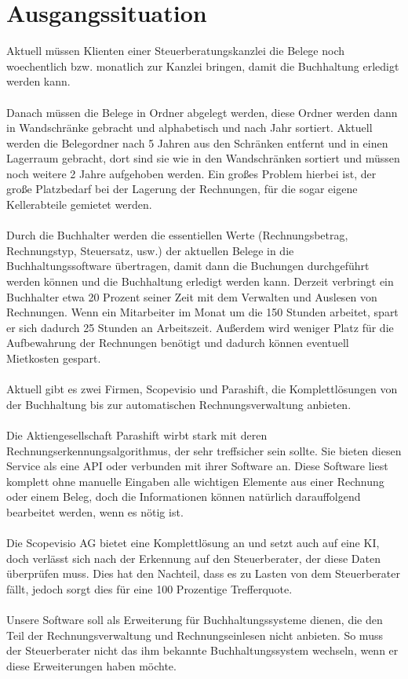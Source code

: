 \documentclass[12pt]{article}
\theoremstyle{definition}
\begin{document}
\section{Ausgangssituation}

Aktuell müssen Klienten einer Steuerberatungskanzlei die Belege noch woechentlich bzw. monatlich zur Kanzlei bringen, damit die Buchhaltung erledigt werden kann.\\ \\
Danach müssen die Belege in Ordner abgelegt werden, diese Ordner werden dann in Wandschränke gebracht und alphabetisch und nach Jahr sortiert. Aktuell werden die Belegordner nach 5 Jahren aus den Schränken entfernt und in einen Lagerraum gebracht, dort sind sie wie in den Wandschränken sortiert und müssen noch weitere 2 Jahre aufgehoben werden. Ein großes Problem hierbei ist, der große Platzbedarf bei der Lagerung der Rechnungen, für die sogar eigene Kellerabteile gemietet werden.\\ \\
Durch die Buchhalter werden die essentiellen Werte (Rechnungsbetrag, Rechnungstyp, Steuersatz, usw.) der aktuellen Belege in die Buchhaltungssoftware über\-tragen, damit dann die Buchungen durchgeführt werden können und die Buchhaltung erledigt werden kann.
Derzeit verbringt ein Buchhalter etwa 20 Prozent seiner Zeit mit dem Verwalten und Auslesen von Rechnungen. Wenn ein Mitarbeiter im Monat um die 150 Stunden arbeitet, spart er sich dadurch 25 Stunden an Arbeitszeit. Außerdem wird weniger Platz für die Aufbewahrung der Rechnungen benötigt und dadurch können eventuell Mietkosten gespart.\\ \\
Aktuell gibt es zwei Firmen, Scopevisio und Parashift, die Komplettlösungen von der Buchhaltung bis zur automatischen Rechnungsverwaltung anbieten.\\ \\
Die Aktiengesellschaft Parashift wirbt stark mit deren Rechnungserkennungsalgorithmus, der sehr treffsicher sein sollte. Sie bieten diesen Service als eine API oder verbunden mit ihrer Software an. Diese Software liest komplett ohne manuelle Eingaben alle wichtigen Elemente aus einer Rechnung oder einem Beleg, doch die Informationen können natürlich darauffolgend bearbeitet werden, wenn es nötig ist.\\ \\
Die Scopevisio AG bietet eine Komplettlösung an und setzt auch auf eine KI, doch verlässt sich nach der Erkennung auf den Steuerberater, der diese Daten überprüfen muss. Dies hat den Nachteil, dass es zu Lasten von dem Steuerberater fällt, jedoch sorgt dies für eine 100 Prozentige Trefferquote.\\ \\
Unsere Software soll als Erweiterung für Buchhaltungssysteme dienen, die den Teil der Rechnungsverwaltung und Rechnungseinlesen nicht anbieten. So muss der Steuerberater nicht das ihm bekannte Buchhaltungssystem wechseln, wenn er diese Erweiterungen haben möchte.\\
\pagebreak
\end{document}
